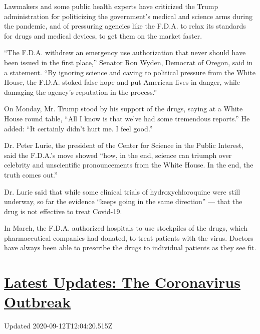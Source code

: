 Lawmakers and some public health experts have criticized the Trump
administration for politicizing the government's medical and science
arms during the pandemic, and of pressuring agencies like the F.D.A. to
relax its standards for drugs and medical devices, to get them on the
market faster.

``The F.D.A. withdrew an emergency use authorization that never should
have been issued in the first place,'' Senator Ron Wyden, Democrat of
Oregon, said in a statement. ``By ignoring science and caving to
political pressure from the White House, the F.D.A. stoked false hope
and put American lives in danger, while damaging the agency's reputation
in the process.''

On Monday, Mr. Trump stood by his support of the drugs, saying at a
White House round table, ``All I know is that we've had some tremendous
reports.'' He added: ``It certainly didn't hurt me. I feel good.''

Dr. Peter Lurie, the president of the Center for Science in the Public
Interest, said the F.D.A.'s move showed ``how, in the end, science can
triumph over celebrity and unscientific pronouncements from the White
House. In the end, the truth comes out.''

Dr. Lurie said that while some clinical trials of hydroxychloroquine
were still underway, so far the evidence ``keeps going in the same
direction'' --- that the drug is not effective to treat Covid-19.

In March, the F.D.A. authorized hospitals to use stockpiles of the
drugs, which pharmaceutical companies had donated, to treat patients
with the virus. Doctors have always been able to prescribe the drugs to
individual patients as they see fit.

\hypertarget{latest-updates-the-coronavirus-outbreak}{%
\section{\texorpdfstring{\href{https://www.nytimes3xbfgragh.onion/2020/09/11/world/covid-19-coronavirus.html?action=click\&pgtype=Article\&state=default\&region=MAIN_CONTENT_1\&context=storylines_live_updates}{Latest
Updates: The Coronavirus
Outbreak}}{Latest Updates: The Coronavirus Outbreak}}\label{latest-updates-the-coronavirus-outbreak}}

Updated 2020-09-12T12:04:20.515Z

